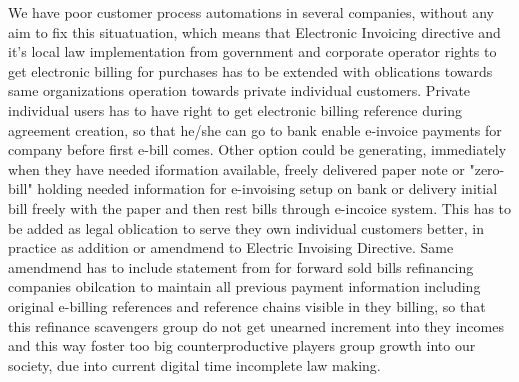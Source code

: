 We have poor customer process automations in several companies,
without any aim to fix this situatuation, which means
that Electronic Invoicing directive\cite{EULEX_2014_55} and it's local law
imp\-le\-men\-ta\-tion\cite{LEX_2019_241} from government and corporate operator
rights to get electronic billing for purchases has to be extended with
oblications towards same organizations operation towards private individual
customers. Private individual users has to have right to get electronic
billing reference during agreement creation, so that he/she can go to bank
enable e-invoice payments for company before first e-bill comes. Other option
could be generating, immediately when they have needed iformation available,
freely delivered paper note or "zero-bill" holding needed information for
e-invoising setup on bank or delivery initial bill freely with the paper and
then rest bills through e-incoice system. This has to be added as legal
oblication to serve they own individual customers better, in practice as
addition or amendmend to Electric Invoising Directive\cite{EULEX_2014_55}.
Same amendmend has to include statement from for forward sold bills
refinancing companies obilcation to maintain all previous payment information
including original e-billing references and reference chains visible in they
billing, so that this refinance scavengers group do not get unearned increment
into they incomes and this way foster too big counterproductive players group
growth into our society, due into current digital time incomplete law making.

\begin{comment}\end{comment}
